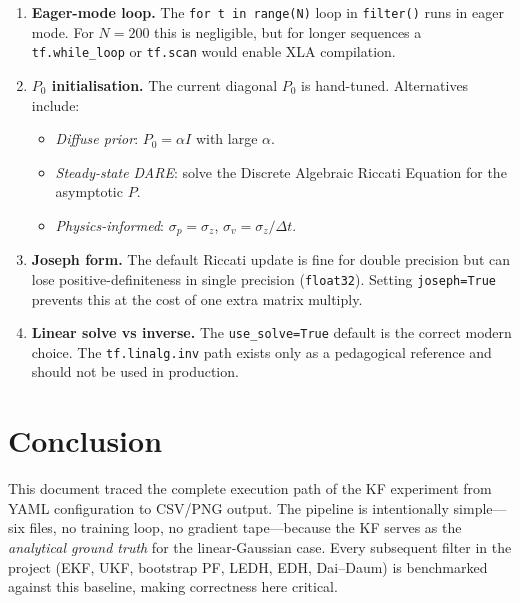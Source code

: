 \documentclass[11pt,a4paper]{article}
\newcommand{\py}[1]{\lstinline[style=py]{#1}}
\begin{document}
\begin{enumerate}
\item \textbf{Eager-mode loop.}
  The \py{for t in range(N)} loop in \py{filter()} runs in eager
  mode.  For $N=200$ this is negligible, but for longer sequences a
  \py{tf.while_loop} or \py{tf.scan} would enable XLA compilation.

\item \textbf{$P_0$ initialisation.}
  The current diagonal $P_0$ is hand-tuned.  Alternatives include:
  \begin{itemize}
  \item \emph{Diffuse prior}: $P_0 = \alpha I$ with large $\alpha$.
  \item \emph{Steady-state DARE}: solve the Discrete Algebraic
        Riccati Equation for the asymptotic $P$.
  \item \emph{Physics-informed}:
        $\sigma_{p} = \sigma_z$,
        $\sigma_{v} = \sigma_z / \Delta t$.
  \end{itemize}

\item \textbf{Joseph form.}
  The default Riccati update is fine for double precision but can
  lose positive-definiteness in single precision (\py{float32}).
  Setting \py{joseph=True} prevents this at the cost of one extra
  matrix multiply.

\item \textbf{Linear solve vs inverse.}
  The \py{use_solve=True} default is the correct modern choice.
  The \py{tf.linalg.inv} path exists only as a pedagogical reference
  and should not be used in production.
\end{enumerate}


\section{Conclusion}

This document traced the complete execution path of the KF experiment
from YAML configuration to CSV/PNG output.  The pipeline is
intentionally simple---six files, no training loop, no gradient
tape---because the KF serves as the \emph{analytical ground truth}
for the linear-Gaussian case.  Every subsequent filter in the project
(EKF, UKF, bootstrap PF, LEDH, EDH, Dai--Daum) is benchmarked
against this baseline, making correctness here critical.
\end{document}
